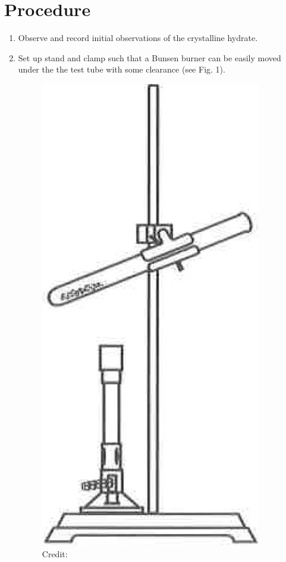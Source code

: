 \documentclass[12pt]{article}
\begin{document}
		\section{Procedure}
		\begin{enumerate}
			\item Observe and record initial observations of the crystalline hydrate.
			\item Set up stand and clamp such that a Bunsen burner can be easily moved under the the test tube with some clearance (see Fig. 1).
			      \begin{figure}[h]
			      	\centering
			      	\includegraphics[scale = 0.75]{Tube_Stand}
			      	\hspace*{15pt}\hbox{\scriptsize Credit:}

\end{figure}
\end{enumerate}
\end{document}
